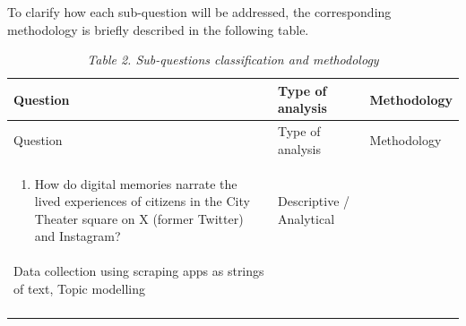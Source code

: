 \documentclass[
  letterpaper,
  DIV=11,
  numbers=noendperiod]{scrartcl}
\providecommand{\tightlist}{%
  \setlength{\itemsep}{0pt}\setlength{\parskip}{0pt}}
\begin{document}
To clarify how each sub-question will be addressed, the corresponding
methodology is briefly described in the following table.

\begin{longtable}[]{@{}
  >{\centering\arraybackslash}p{}
  >{\centering\arraybackslash}p{}
  >{\centering\arraybackslash}p{}@{}}
\caption{\emph{Table 2. Sub-questions classification and
methodology}}\tabularnewline
\toprule\noalign{}
\begin{minipage}[b]{\linewidth}\centering
Question
\end{minipage} & \begin{minipage}[b]{\linewidth}\centering
Type of analysis
\end{minipage} & \begin{minipage}[b]{\linewidth}\centering
Methodology
\end{minipage} \\
\midrule\noalign{}
\endfirsthead
\toprule\noalign{}
\begin{minipage}[b]{\linewidth}\centering
Question
\end{minipage} & \begin{minipage}[b]{\linewidth}\centering
Type of analysis
\end{minipage} & \begin{minipage}[b]{\linewidth}\centering
Methodology
\end{minipage} \\
\midrule\noalign{}
\endhead
\bottomrule\noalign{}
\endlastfoot
\begin{minipage}[t]{\linewidth}\centering
\begin{enumerate}
\def\labelenumi{\arabic{enumi}.}
\tightlist
\item
  How do digital memories narrate the lived experiences of citizens in
  the City Theater square on X (former Twitter) and Instagram?
\end{enumerate}
\end{minipage} & Descriptive / Analytical &
\begin{minipage}[t]{\linewidth}\centering
Literature review,\\
Data collection using scraping apps as strings of text, Topic
modelling\strut
\end{minipage} \\
\begin{minipage}[t]{\linewidth}\centering
\begin{enumerate}

\end{enumerate}
\end{minipage}
\end{longtable}
\end{document}
